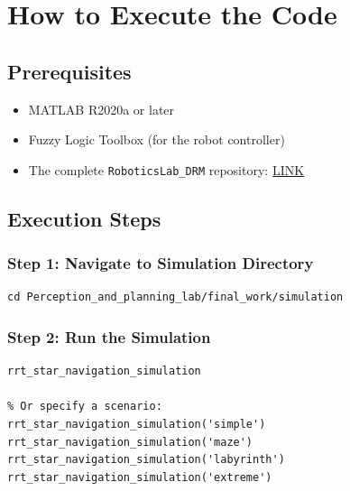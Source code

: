 \documentclass[12pt,a4paper]{scrartcl}
\begin{document}
	\section{How to Execute the Code}
	
	\subsection{Prerequisites}
	
	\begin{itemize}
		\item MATLAB R2020a or later
		\item Fuzzy Logic Toolbox (for the robot controller)
		\item The complete \texttt{RoboticsLab\_DRM} repository: \href{https://github.com/97hackbrian/RoboticsLab_DRM.git}{LINK}
	\end{itemize}
	
	\subsection{Execution Steps}
	
	\subsubsection{Step 1: Navigate to Simulation Directory}
	
	\begin{lstlisting}[style=matlabstyle,caption={Navigate to simulation folder}]
% In MATLAB Command Window:
cd Perception_and_planning_lab/final_work/simulation
	\end{lstlisting}
	
	\subsubsection{Step 2: Run the Simulation}
	
	\begin{lstlisting}[style=matlabstyle,caption={Execute main simulation}]
% Run with default scenario (labyrinth):
rrt_star_navigation_simulation

% Or specify a scenario:
rrt_star_navigation_simulation('simple')
rrt_star_navigation_simulation('maze')
rrt_star_navigation_simulation('labyrinth')
rrt_star_navigation_simulation('extreme')
	\end{lstlisting}
	
\end{document}
